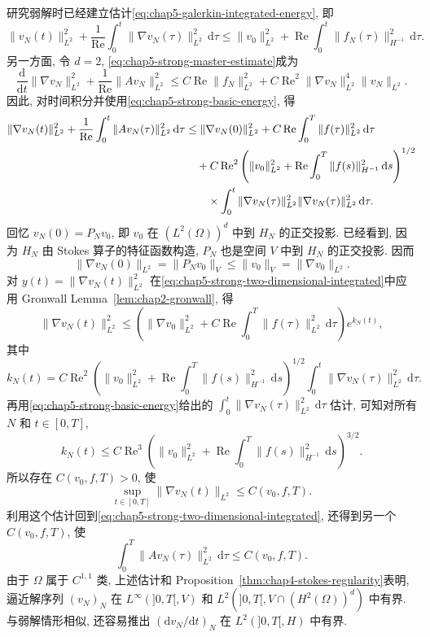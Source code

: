 研究弱解时已经建立估计\eqref{eq:chap5-galerkin-integrated-energy}, 即
\begin{equation}
 \|v_N(t)\|_{L^2}^2
 +\frac1{\operatorname{Re}}\int_0^t\|\nabla v_N(\tau)\|_{L^2}^2\,\mathrm d\tau
 \leq\|v_0\|_{L^2}^2
 +\operatorname{Re}\int_0^t\|f_N(\tau)\|_{H^{-1}}^2\,\mathrm d\tau.
\label{eq:chap5-strong-basic-energy}
\end{equation}
另一方面, 令 $d=2$, \eqref{eq:chap5-strong-master-estimate}成为
\begin{equation}
 \frac{\mathrm d}{\mathrm dt}\|\nabla v_N\|_{L^2}^2
 +\frac1{\operatorname{Re}}\|Av_N\|_{L^2}^2
 \leq C\operatorname{Re}\|f_N\|_{L^2}^2
 +C\operatorname{Re}^2\|\nabla v_N\|_{L^2}^4\|v_N\|_{L^2}.
\label{eq:chap5-strong-two-dimensional-estimate}
\end{equation}
因此, 对时间积分并使用\eqref{eq:chap5-strong-basic-energy}, 得
\begin{align}
 \|\nabla v_N(t)\|_{L^2}^2
 +\frac1{\operatorname{Re}}\int_0^t\|Av_N(\tau)\|_{L^2}^2\,\mathrm d\tau
 &\leq\|\nabla v_N(0)\|_{L^2}^2
 +C\operatorname{Re}\int_0^T\|f(\tau)\|_{L^2}^2\,\mathrm d\tau\notag\\
 &\quad+C\operatorname{Re}^2
 \left(\|v_0\|_{L^2}^2
 +\operatorname{Re}\int_0^T\|f(s)\|_{H^{-1}}^2\,\mathrm ds\right)^{1/2}
 \notag\\
 &\qquad\times\int_0^t\|\nabla v_N(\tau)\|_{L^2}^2
 \|\nabla v_N(\tau)\|_{L^2}^2\,\mathrm d\tau.
\label{eq:chap5-strong-two-dimensional-integrated}
\end{align}
回忆 $v_N(0)=P_Nv_0$, 即 $v_0$ 在 $(L^2(\Omega))^d$ 中到 $H_N$ 的正交投影. 已经看到, 因为 $H_N$ 由 Stokes 算子的特征函数构造, $P_N$ 也是空间 $V$ 中到 $H_N$ 的正交投影. 因而
\begin{equation}
 \|\nabla v_N(0)\|_{L^2}=\|P_Nv_0\|_V
 \leq\|v_0\|_V=\|\nabla v_0\|_{L^2}.
\label{eq:chap5-strong-initial-projection}
\end{equation}
对 $y(t)=\|\nabla v_N(t)\|_{L^2}^2$ 在\eqref{eq:chap5-strong-two-dimensional-integrated}中应用 Gronwall Lemma~\ref{lem:chap2-gronwall}, 得
\[
 \|\nabla v_N(t)\|_{L^2}^2
 \leq\left(\|\nabla v_0\|_{L^2}^2
 +C\operatorname{Re}\int_0^T\|f(\tau)\|_{L^2}^2\,\mathrm d\tau\right)e^{k_N(t)},
\]
其中
\[
 k_N(t)=C\operatorname{Re}^2
 \left(\|v_0\|_{L^2}^2+\operatorname{Re}\int_0^T\|f(s)\|_{H^{-1}}^2\,\mathrm ds\right)^{1/2}
 \int_0^t\|\nabla v_N(\tau)\|_{L^2}^2\,\mathrm d\tau.
\]
再用\eqref{eq:chap5-strong-basic-energy}给出的 $\int_0^t\|\nabla v_N(\tau)\|_{L^2}^2\,\mathrm d\tau$ 估计, 可知对所有 $N$ 和 $t\in[0,T]$,
\[
 k_N(t)\leq C\operatorname{Re}^3
 \left(\|v_0\|_{L^2}^2+\operatorname{Re}\int_0^T\|f(s)\|_{H^{-1}}^2\,\mathrm ds\right)^{3/2}.
\]
所以存在 $C(v_0,f,T)>0$, 使
\[
 \sup_{t\in[0,T]}\|\nabla v_N(t)\|_{L^2}\leq C(v_0,f,T).
\]
利用这个估计回到\eqref{eq:chap5-strong-two-dimensional-integrated}, 还得到另一个 $C(v_0,f,T)$, 使
\[
 \int_0^T\|Av_N(\tau)\|_{L^2}^2\,\mathrm d\tau\leq C(v_0,f,T).
\]
由于 $\Omega$ 属于 $C^{1,1}$ 类, 上述估计和 Proposition~\ref{thm:chap4-stokes-regularity}表明, 逼近解序列 $(v_N)_N$ 在 $L^\infty(]0,T[,V)$ 和 $L^2(]0,T[,V\cap(H^2(\Omega))^d)$ 中有界. 与弱解情形相似, 还容易推出 $(\mathrm dv_N/\mathrm dt)_N$ 在 $L^2(]0,T[,H)$ 中有界.

